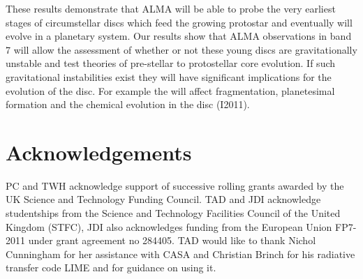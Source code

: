 \documentclass[useAMS,usenatbib]{mn2e}
\begin{document}
These results demonstrate that ALMA will be able to probe the very earliest stages of circumstellar discs which feed the growing protostar and eventually will evolve in a planetary system. Our results show that ALMA observations in band 7 will allow the assessment of whether or not these young discs are gravitationally unstable and test theories of pre-stellar to protostellar core evolution. If such gravitational instabilities exist they will have significant implications for the evolution of the disc. For example the will affect fragmentation, planetesimal formation \citep{Boley2009,Johnson2013,Gibbons2012} and the chemical evolution in the disc (I2011). 

\smallskip

\section*{Acknowledgements}
PC and TWH acknowledge support of successive rolling grants awarded by the UK Science and Technology Funding Council.  
TAD and JDI acknowledge studentships from the Science and Technology Facilities Council of the United Kingdom (STFC), JDI also acknowledges funding from the European Union FP7-2011 under grant agreement no 284405. 
TAD would like to thank Nichol Cunningham for her assistance with CASA and Christian Brinch for his radiative transfer code LIME and for guidance on using it.


 

\bsp
\label{lastpage}
\end{document}
